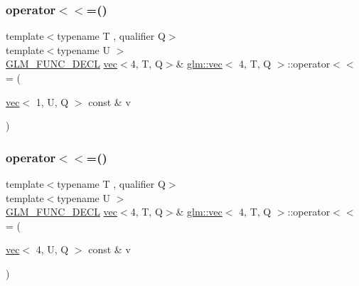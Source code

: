 \subsubsection{\texorpdfstring{operator$<$$<$=()}{operator<<=()}\hspace{0.1cm}{\footnotesize\ttfamily [2/6]}}
{\footnotesize\ttfamily template$<$typename T , qualifier Q$>$ \\
template$<$typename U $>$ \\
\hyperlink{setup_8hpp_ab2d052de21a70539923e9bcbf6e83a51}{G\+L\+M\+\_\+\+F\+U\+N\+C\+\_\+\+D\+E\+CL} \hyperlink{structglm_1_1vec}{vec}$<$4, T, Q$>$\& \hyperlink{structglm_1_1vec}{glm\+::vec}$<$ 4, T, Q $>$\+::operator$<$$<$= (\begin{DoxyParamCaption}\item[{\hyperlink{structglm_1_1vec}{vec}$<$ 1, U, Q $>$ const \&}]{v }\end{DoxyParamCaption})}

\mbox{\label{structglm_1_1vec_3_014_00_01_t_00_01_q_01_4_aee9c69807b9f783f5b6801f86fe153d7}} 
\subsubsection{\texorpdfstring{operator$<$$<$=()}{operator<<=()}\hspace{0.1cm}{\footnotesize\ttfamily [3/6]}}
{\footnotesize\ttfamily template$<$typename T , qualifier Q$>$ \\
template$<$typename U $>$ \\
\hyperlink{setup_8hpp_ab2d052de21a70539923e9bcbf6e83a51}{G\+L\+M\+\_\+\+F\+U\+N\+C\+\_\+\+D\+E\+CL} \hyperlink{structglm_1_1vec}{vec}$<$4, T, Q$>$\& \hyperlink{structglm_1_1vec}{glm\+::vec}$<$ 4, T, Q $>$\+::operator$<$$<$= (\begin{DoxyParamCaption}\item[{\hyperlink{structglm_1_1vec}{vec}$<$ 4, U, Q $>$ const \&}]{v }\end{DoxyParamCaption})}

\mbox{\label{structglm_1_1vec_3_014_00_01_t_00_01_q_01_4_a2f063a4fd07698015d81f2a66023e021}} 
